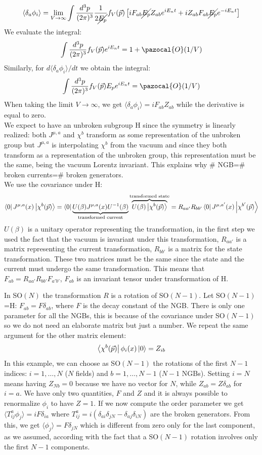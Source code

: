 \documentclass[../main.tex]{subfiles}
\begin{document}
\[
\langle\delta_a\phi_i\rangle=\lim_{V\to\infty}\int\frac{d^3p}{(2\pi)^3}\frac{1}{2\cancel{E_p}}f_V(\Vec{p})\left[iF_{ab}\cancel{E_p}Z_{ab}e^{iE_nt}+iZ_{ab}F_{ab}\cancel{E_p}e^{-iE_nt}\right]
\]
We evaluate the integral:
\[
\int\frac{d^3p}{(2\pi)^3}f_V(\Vec{p})e^{iE_nt}=1+\pazocal{O}(1/V)
\]
Similarly, for $d\langle\delta_a\phi_i\rangle/dt$ we obtain the integral:
\[
\int\frac{d^3p}{(2\pi)^3}f_V(\Vec{p})E_pe^{iE_nt}=\pazocal{O}(1/V)
\]
When taking the limit $V\to\infty$, we get
$\langle\delta_a\phi_i\rangle=iF_{ab}Z_{ab}$ while the derivative is equal to zero.\\
We expect to have an unbroken subgroup H since the symmetry is linearly realized: both $J^{\mu,a}$ and $\chi^b$ transform as some representation of the unbroken group but $J^{\mu,a}$ is interpolating $\chi^b$ from the vacuum and since they both transform as a representation of the unbroken group, this representation must be the same, being the vacuum Lorentz invariant. This explains why \# NGB=\# broken currents=\# broken generators.\\
We use the covariance under H:
\[
\bra{0}J^{\mu,a}(x)\ket{\chi^b(\Vec{p})}=\bra{0}\underbrace{U(\beta)J^{\mu,a}(x)U^{-1}(\beta)}_{\text{transformed current}}\overbrace{U(\beta)\ket{\chi^b(\Vec{p})}}^{\text{transformed state}}=R_{aa'}R_{bb'}\bra{0}J^{\mu,a'}(x)\ket{\chi^{b'}(\Vec{p})}
\]
$U(\beta)$ is a unitary operator representing the transformation, in the first step we used the fact that the vacuum is invariant under this transformation, $R_{aa'}$ is a matrix representing the current transformation, $R_{bb'}$ is a matrix for the state transformation. These two matrices must be the same since the state and the current must undergo the same transformation. This means that $F_{ab}=R_{aa'}R_{bb'}F_{a'b'}$, $F_{ab}$ is an invariant tensor under transformation of H.
\begin{example}
In SO$(N)$ the transformation $R$ is a rotation of SO$(N-1)$. Let SO$(N-1)$=H: $F_{ab}=F\delta_{ab}$, where $F$ is the decay constant of the NGB. There is only one parameter for all the NGBs, this is because of the covariance under SO$(N-1)$ so we do not need an elaborate matrix but just a number. We repeat the same argument for the other matrix element:
\[
\bra{\chi^b(\Vec{p})}\phi_i(x)\ket{0}=Z_{ib}
\]
In this example, we can choose as SO$(N-1)$ the rotations of the first $N-1$ indices: $i=1,\dots,N$ ($N$ fields) and $b=1,\dots,N-1$ ($N-1$ NGBs). Setting $i=N$ means having $Z_{Nb}=0$ because we have no vector for $N$, while $Z_{ab}=Z\delta_{ab}$ for $i=a$. We have only two quantities, $F$ and $Z$ and it is always possible to renormalize $\phi_i$ to have $Z=1$. If we now compute the order parameter we get $\langle T_{ij}^a\phi_j\rangle=iF\delta_{ia}$ where $T_{ij}^a=i(\delta_{ai}\delta_{jN}-\delta_{aj}\delta_{iN})$ are the broken generators. From this, we get $\langle\phi_j\rangle=F\delta_{jN}$ which is different from zero only for the last component, as we assumed, according with the fact that a SO$(N-1)$ rotation involves only the first $N-1$ components.
\end{example}
\end{document}
